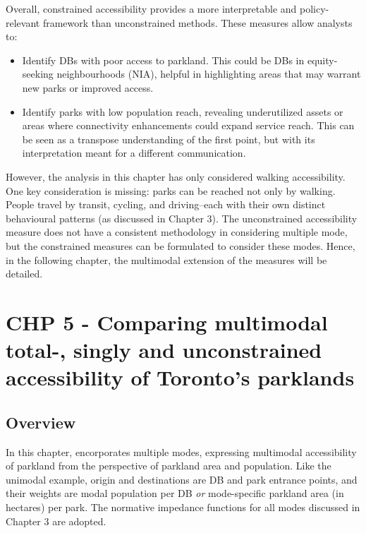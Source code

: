 \documentclass[
11pt, %
oneside, %
english, %
singlespacing, %
]{macthesis} %
\def\tightlist{}
\begin{document}
Overall, constrained accessibility provides a more interpretable and policy-relevant framework than unconstrained methods. These measures allow analysts to:

\begin{itemize}
\tightlist
\item
  Identify DBs with poor access to parkland. This could be DBs in equity-seeking neighbourhoods (NIA), helpful in highlighting areas that may warrant new parks or improved access.
\item
  Identify parks with low population reach, revealing underutilized assets or areas where connectivity enhancements could expand service reach. This can be seen as a transpose understanding of the first point, but with its interpretation meant for a different communication.
\end{itemize}

However, the analysis in this chapter has only considered walking accessibility. One key consideration is missing: parks can be reached not only by walking. People travel by transit, cycling, and driving--each with their own distinct behavioural patterns (as discussed in Chapter 3). The unconstrained accessibility measure does not have a consistent methodology in considering multiple mode, but the constrained measures can be formulated to consider these modes. Hence, in the following chapter, the multimodal extension of the measures will be detailed.

\chapter{CHP 5 - Comparing multimodal total-, singly and unconstrained accessibility of Toronto's parklands}\label{chp-5---comparing-multimodal-total--singly-and-unconstrained-accessibility-of-torontos-parklands}

\section{Overview}\label{overview-2}

In this chapter, encorporates multiple modes, expressing multimodal accessibility of parkland from the perspective of parkland area and population. Like the unimodal example, origin and destinations are DB and park entrance points, and their weights are modal population per DB \emph{or} mode-specific parkland area (in hectares) per park. The normative impedance functions for all modes discussed in Chapter 3 are adopted.
\end{document}
